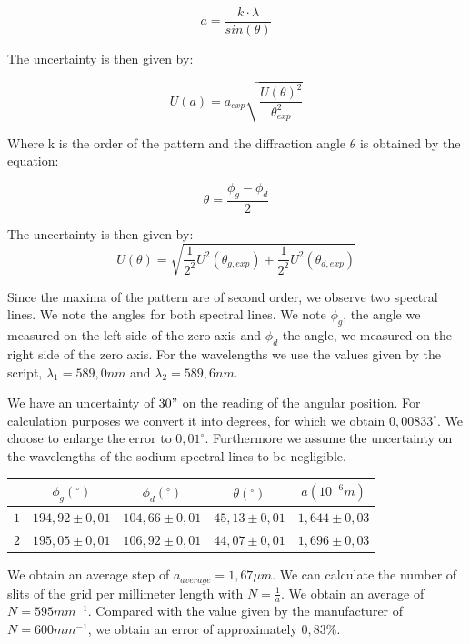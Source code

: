 \documentclass{scrartcl}
\begin{document}
\centering
\begin{equation}
    a=\frac{k\cdot \lambda}{sin(\theta)}
\end{equation}
\flushleft

The uncertainty is then given by:

\begin{equation}
    U(a) = a_{exp}\sqrt{\frac{U(\theta)^2}{\theta_{exp}^2}}
\end{equation}

Where k is the order of the pattern and the diffraction angle $\theta$ is obtained by the equation:

\centering
\begin{equation}\nonumber
    \theta=\frac{\phi_g-\phi_d}{2}
\end{equation}
\flushleft

The uncertainty is then given by:
\begin{equation}
    U(\theta)= \sqrt{\frac{1}{2^2}U^2(\theta_{g,exp})+\frac{1}{2^2}U^2(\theta_{d,exp})}
\end{equation}

Since the maxima of the pattern are of second order, we observe two spectral lines. We note the angles for both spectral lines.
We note $\phi_g$, the angle we measured on the left side of the zero axis and $\phi_d$ the angle, we measured on the right side of the zero axis.
For the wavelengths we use the values given by the script, $\lambda_1=589,0nm$ and $\lambda_2=589,6nm$.\newline

We have an uncertainty of $30"$ on the reading of the angular position. For calculation purposes we convert it into degrees, for which we obtain $0,00833^\circ$. We choose to enlarge the error to $0,01^\circ$. Furthermore we assume the uncertainty on the wavelengths of the sodium spectral lines to be negligible.
 

\medskip
\centering
\begin{tabular}{|c|c|c|c|c|}
    \hline
     &$\phi_g (^{\circ})$ & $\phi_d(^{\circ})$ & $\theta(^{\circ})$ & $a (10^{-6}m)$\\
     \hline
     $1$ & $194,92\pm 0,01$ & $104,66\pm 0,01$ & $45,13\pm 0,01$ & $1,644 \pm 0,03$\\
     \hline
     $2$ & $195,05\pm 0,01$ & $106,92\pm 0,01$ & $44,07\pm 0,01$ & $1,696 \pm 0,03$ \\
     \hline
\end{tabular}
\flushleft

We obtain an average step of $a_{average}=1,67\mu m$. We can calculate the number of slits of the grid per millimeter length with $N=\frac{1}{a}$. We obtain an average of $N=595mm^{-1}$. Compared with the value given by the manufacturer of $N=600mm^{-1}$, we obtain an error of approximately $0,83\%$.
\end{document}
